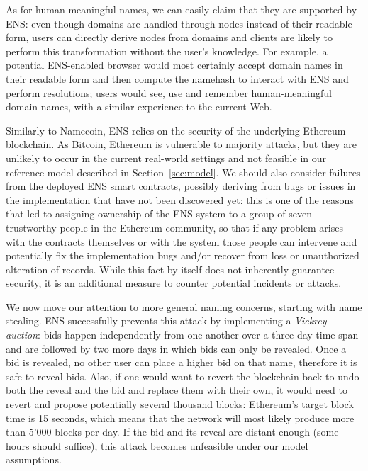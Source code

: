\documentclass[mscthesis]{usiinfthesis}
\begin{document}
As for human-meaningful names, we can easily claim that they are supported by ENS: even though domains are handled through nodes instead of their readable form, users can directly derive nodes from domains and clients are likely to perform this transformation without the user's knowledge. For example, a potential ENS-enabled browser would most certainly accept domain names in their readable form and then compute the namehash to interact with ENS and perform resolutions; users would see, use and remember human-meaningful domain names, with a similar experience to the current Web.

Similarly to Namecoin, ENS relies on the security of the underlying Ethereum blockchain. As Bitcoin, Ethereum is vulnerable to majority attacks, but they are unlikely to occur in the current real-world settings and not feasible in our reference model described in Section~\ref{sec:model}.
We should also consider failures from the deployed ENS smart contracts, possibly deriving from bugs or issues in the implementation that have not been discovered yet: this is one of the reasons that led to assigning ownership of the ENS system to a group of seven trustworthy people in the Ethereum community, so that if any problem arises with the contracts themselves or with the system those people can intervene and potentially fix the implementation bugs and/or recover from loss or unauthorized alteration of records. While this fact by itself does not inherently guarantee security, it is an additional measure to counter potential incidents or attacks.

We now move our attention to more general naming concerns, starting with name stealing. ENS successfully prevents this attack by implementing a \emph{Vickrey auction}: bids happen independently from one another over a three day time span and are followed by two more days in which bids can only be revealed. Once a bid is revealed, no other user can place a higher bid on that name, therefore it is safe to reveal bids. Also, if one would want to revert the blockchain back to undo both the reveal and the bid and replace them with their own, it would need to revert and propose potentially several thousand blocks: Ethereum's target block time is 15 seconds, which means that the network will most likely produce more than 5'000 blocks per day. If the bid and its reveal are distant enough (some hours should suffice), this attack becomes unfeasible under our model assumptions.
\end{document}
